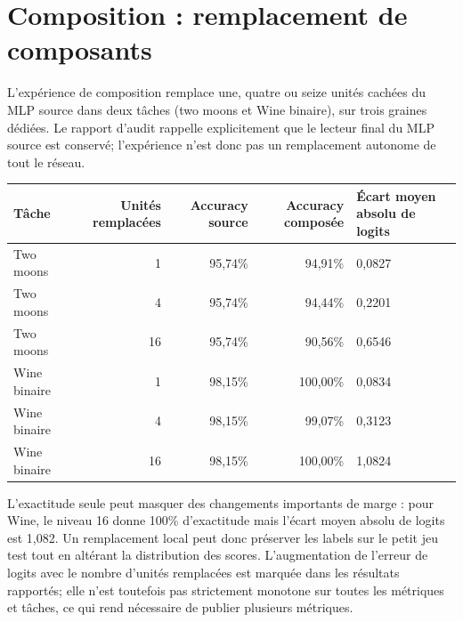 \documentclass[11pt,a4paper,oneside]{report}
\begin{document}
\section{Composition : remplacement de composants}
L'expérience de composition remplace une, quatre ou seize unités cachées du MLP source dans deux tâches (two moons et Wine binaire), sur trois graines dédiées. Le rapport d'audit rappelle explicitement que le lecteur final du MLP source est conservé; l'expérience n'est donc pas un remplacement autonome de tout le réseau.
\begin{center}
\small
\begin{tabular}{p{1.5cm}rrrp{4.2cm}}
\toprule
Tâche & Unités remplacées & Accuracy source & Accuracy composée & Écart moyen absolu de logits\\
\midrule
Two moons & 1 & 95,74\% & 94,91\% & 0,0827\\
Two moons & 4 & 95,74\% & 94,44\% & 0,2201\\
Two moons & 16 & 95,74\% & 90,56\% & 0,6546\\
Wine binaire & 1 & 98,15\% & 100,00\% & 0,0834\\
Wine binaire & 4 & 98,15\% & 99,07\% & 0,3123\\
Wine binaire & 16 & 98,15\% & 100,00\% & 1,0824\\
\bottomrule
\end{tabular}
\end{center}
L'exactitude seule peut masquer des changements importants de marge : pour Wine, le niveau 16 donne 100\% d'exactitude mais l'écart moyen absolu de logits est 1,082. Un remplacement local peut donc préserver les labels sur le petit jeu test tout en altérant la distribution des scores. L'augmentation de l'erreur de logits avec le nombre d'unités remplacées est marquée dans les résultats rapportés; elle n'est toutefois pas strictement monotone sur toutes les métriques et tâches, ce qui rend nécessaire de publier plusieurs métriques.
\end{document}
